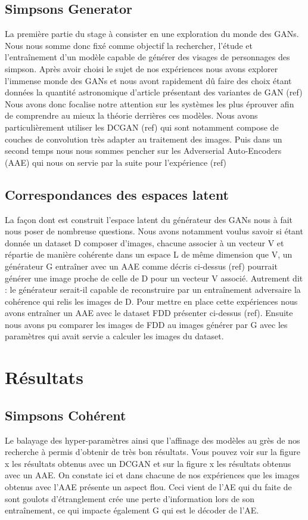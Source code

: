 \documentclass[11pt,francais]{article}
\begin{document}
\subsection{Simpsons Generator}
La première partie du stage à consister en une exploration du monde des GANs. Nous nous somme donc fixé comme objectif la rechercher, l'étude et l'entraînement d'un modèle capable de générer des visages de personnages des simpson.
Après avoir choisi le sujet de nos expériences nous avons explorer l'immense monde des GANs et nous avont rapidement dû faire des choix étant données la quantité astronomique d'article présentant des variantes de GAN (ref)
Nous avons donc focalise notre attention sur les systèmes les plus éprouver afin de comprendre au mieux la théorie derrières ces modèles.
Nous avons particulièrement utiliser les DCGAN (ref) qui sont notamment compose de couches de convolution très adapter au traitement des images. Puis dans un second temps nous nous sommes pencher sur les Adverserial Auto-Encoders (AAE) qui nous on servie par la suite pour l'expérience (ref)

\subsection{Correspondances des espaces latent}
La façon dont est construit l'espace latent du générateur des GANs nous à fait nous poser de nombreuse questions.
Nous avons notamment voulus savoir si étant donnée un dataset D composer d'images, chacune associer à un vecteur V et répartie de manière cohérente dans un espace L de même dimension que V, un générateur G entraîner avec un AAE comme décris ci-dessus (ref) pourrait générer une image proche de celle de D pour un vecteur V associé. Autrement dit : le générateur serait-il capable de reconstruire par un entraînement adversaire la cohérence qui relis les images de D. 
Pour mettre en place cette expériences nous avons entraîner un AAE avec le dataset FDD présenter ci-dessus (ref). Ensuite nous avons pu comparer les images de FDD au images générer par G avec les paramètres qui avait servie a calculer les images du dataset.

\section{Résultats}

\subsection{Simpsons Cohérent}
Le balayage des hyper-paramètres ainsi que l'affinage des modèles au grès de nos recherche à permis d'obtenir de très bon résultats. Vous pouvez voir sur la figure x les résultats obtenus avec un DCGAN et sur la figure x les résultats obtenus avec un AAE.
On constate ici et dans chacune de nos expériences que les images obtenus avec l'AAE présente un aspect flou. Ceci vient de l'AE qui du faite de sont goulots d'étranglement crée une perte d'information lors de son entraînement, ce qui impacte également G qui est le décoder de l'AE.
\end{document}
